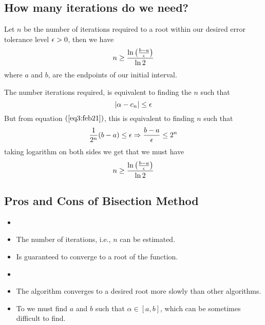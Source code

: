 \subsection{How many iterations do we need?}

\begin{thm}
    Let $n$ be the number of iterations required to a root within our desired error tolerance level $\epsilon > 0$, then we have 
    \[
        n \geq \frac{\ln{\left( \frac{b-a}{\epsilon} \right)}}{\ln{2}}   
    \]
    where $a$ and $b$, are the endpoints of our initial interval. 
\end{thm}

The number iterations required, is equivalent to finding the $n$ such that 
\[
    |\alpha - c_n| \leq \epsilon    
\]
But from equation $(\ref{eq3:feb21})$, this is equivalent to finding $n$ such that 
\[
    \frac{1}{2^n}(b-a) \leq \epsilon \Rightarrow \frac{b-a}{\epsilon} \leq 2^n
\]  
taking logarithm on both sides we get that we must have 
\begin{equation}\label{eq4:feb21}
    n \geq \frac{\ln{\left( \frac{b-a}{\epsilon} \right)}}{\ln{2}}
\end{equation}

\subsection{Pros and Cons of Bisection Method}

\begin{tcolorbox}[
    colback = green!5,
    colframe = green!75
]
\begin{itemize}
    \item[\texty{Pros:}]
    \item The number of iterations, i.e., $n$ can be estimated.
    \item Is guaranteed to converge to a root of the function.
\end{itemize}
\end{tcolorbox}

\begin{tcolorbox}[
    colback = red!5,
    colframe = red!75
]
    \begin{itemize}
        \item[\texty{Cons:}]
        \item The algorithm converges to a desired root more slowly than other algorithms.
        \item To we must find $a$ and $b$ such that $\alpha \in [a,b]$, which can be sometimes difficult to find.
    \end{itemize}    
\end{tcolorbox}

